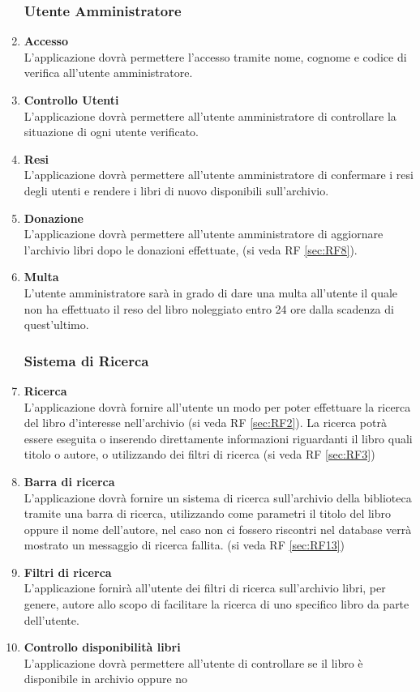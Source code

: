 \documentclass{article}
\begin{document}
\begin{enumerate}
    \subsubsection{Utente Amministratore}
        \item \textbf{Accesso}\label{sec:RF10}\\
        L’applicazione dovrà permettere l’accesso tramite nome, cognome e codice di verifica all’utente amministratore.
        \item \textbf{Controllo Utenti}\label{sec:RF11}\\
        L’applicazione dovrà permettere all’utente amministratore di controllare la situazione di ogni utente verificato.
        \item \textbf{Resi}\label{sec:RF12}\\
        L’applicazione dovrà permettere all’utente amministratore di confermare i resi degli utenti e rendere i libri di nuovo disponibili sull’archivio.
        \item \textbf{Donazione}\label{sec:RF13}\\
        L’applicazione dovrà permettere all’utente amministratore di aggiornare l’archivio libri dopo le donazioni effettuate, (si veda RF \ref{sec:RF8}).
        \item \textbf{Multa}\label{sec:RF14}\\
        L'utente amministratore sarà in grado di dare una multa all'utente il quale non ha effettuato il reso del libro noleggiato entro 24 ore dalla scadenza di quest'ultimo.
    \subsubsection{Sistema di Ricerca}
        \item \textbf{Ricerca}\\
        L’applicazione dovrà fornire all’utente un modo per poter effettuare la ricerca del libro d’interesse nell’archivio (si veda RF \ref{sec:RF2}). La ricerca potrà essere eseguita o inserendo direttamente informazioni riguardanti il libro quali titolo o autore, o utilizzando dei filtri di ricerca (si veda RF \ref{sec:RF3})
        \item \textbf{Barra di ricerca}\label{sec:RF15}\\
        L’applicazione dovrà fornire un sistema di ricerca sull’archivio della biblioteca tramite una barra di ricerca, utilizzando come parametri il titolo del libro oppure il nome dell’autore, nel caso non ci fossero riscontri nel database verrà mostrato un messaggio di ricerca fallita. (si veda RF \ref{sec:RF13})
        \item \textbf{Filtri di ricerca}\label{sec:RF16}\\
        L’applicazione fornirà all’utente dei filtri di ricerca sull’archivio libri, per genere, autore allo scopo di facilitare la ricerca di uno specifico libro da parte dell’utente.
        \item \textbf{Controllo disponibilità libri}\label{sec:RF17}\\
        L’applicazione dovrà permettere all’utente di controllare se il libro è disponibile in archivio oppure no

\end{enumerate}
\end{document}
